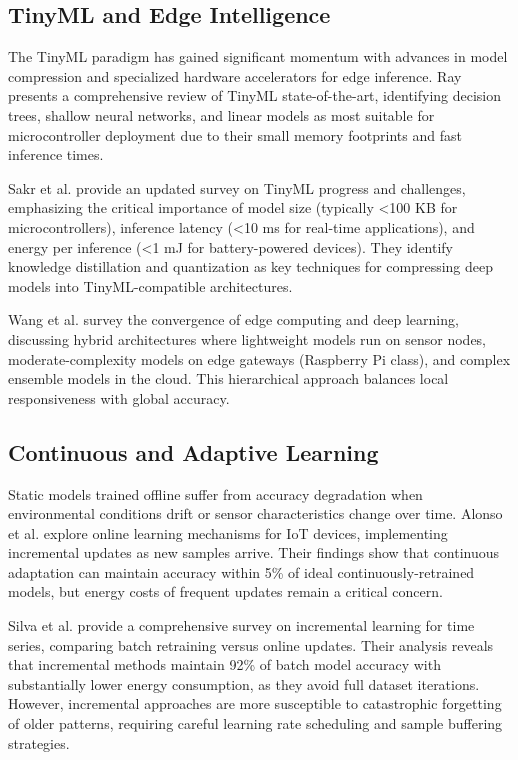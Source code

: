 \documentclass[12pt,a4paper]{article}
\begin{document}
\subsection{TinyML and Edge Intelligence}

The TinyML paradigm has gained significant momentum with advances in model compression and specialized hardware accelerators for edge inference. Ray \cite{Ray2022TinyMLDeployment} presents a comprehensive review of TinyML state-of-the-art, identifying decision trees, shallow neural networks, and linear models as most suitable for microcontroller deployment due to their small memory footprints and fast inference times.

Sakr et al. \cite{Sakr2024TinyMLApplications} provide an updated survey on TinyML progress and challenges, emphasizing the critical importance of model size (typically <100 KB for microcontrollers), inference latency (<10 ms for real-time applications), and energy per inference (<1 mJ for battery-powered devices). They identify knowledge distillation and quantization as key techniques for compressing deep models into TinyML-compatible architectures.

Wang et al. \cite{Wang2023EdgeAI} survey the convergence of edge computing and deep learning, discussing hybrid architectures where lightweight models run on sensor nodes, moderate-complexity models on edge gateways (Raspberry Pi class), and complex ensemble models in the cloud. This hierarchical approach balances local responsiveness with global accuracy.

\subsection{Continuous and Adaptive Learning}

Static models trained offline suffer from accuracy degradation when environmental conditions drift or sensor characteristics change over time. Alonso et al. \cite{Alonso2024OnlineLearning} explore online learning mechanisms for IoT devices, implementing incremental updates as new samples arrive. Their findings show that continuous adaptation can maintain accuracy within 5\% of ideal continuously-retrained models, but energy costs of frequent updates remain a critical concern.

Silva et al. \cite{Silva2023IncrementalML} provide a comprehensive survey on incremental learning for time series, comparing batch retraining versus online updates. Their analysis reveals that incremental methods maintain 92\% of batch model accuracy with substantially lower energy consumption, as they avoid full dataset iterations. However, incremental approaches are more susceptible to catastrophic forgetting of older patterns, requiring careful learning rate scheduling and sample buffering strategies.
\end{document}

